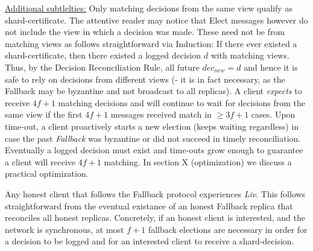 \underline{Additional subtlelties:} Only matching decisions from the same view qualify as shard-certificate. The attentive reader may notice that Elect messages however do not include the view in which a decision was made. These need not be from matching views as follows straightforward via Induction: If there ever existed a shard-certificate, then there existed a logged decision $d$ with matching views. Thus, by the Decision Reconciliation Rule, all future $dec_{new} = d$ and hence it is safe to rely on decisions from different views (- it is in fact necessary, as the Fallback may be byzantine and not broadcast to all replicas).
A client \textit{expects} to receive $4f+1$ matching decisions and will continue to wait for decisions from the same view if the first $4f+1$ messages received match in $\geq 3f+1$ cases. Upon time-out, a client proactively starts a new election (keeps waiting regardless) in case the past \textit{Fallback} was byzantine or did not succeed in timely reconciliation. Eventually a logged decision must exist and time-outs grow enough to guarantee a client will receive $4f+1$ matching. In section X (optimization) we discuss a practical optimization.
 \\


Any honest client that follows the Fallback protocol experiences \textit{Liv}. This follows straightforward from the eventual existance of an honest Fallback replica that reconciles all honest replicas. Concretely, if an honest client is interested, and the network is synchronous, at most $f+1$ fallback elections are necessary in order for a decision to be logged and for an interested client to receive a shard-decision.


